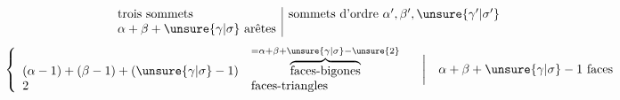 \[
\begin{array}{l|l}
\text{trois sommets}&\text{sommets d'ordre }\alpha',\beta',\unsure{\gamma'|\sigma'}\\
\alpha+\beta+\unsure{\gamma|\sigma}\ \text{arêtes}&
\end{array}
\]
\deleted{$\unsure{\alpha+\beta+\gamma}$}
\[
\left\{\begin{array}{ll}
(\alpha-1)+(\beta-1)+(\unsure{\gamma|\sigma}-1)&
\overbrace{\text{faces-bigones}}^{=\alpha+\beta+\unsure{\gamma|\sigma}-\unsure{2}}\\
2&\text{faces-triangles}
\end{array}\right.
\quad\bigg|\quad \alpha+\beta+\unsure{\gamma|\sigma}-1\ \text{faces}
\]
